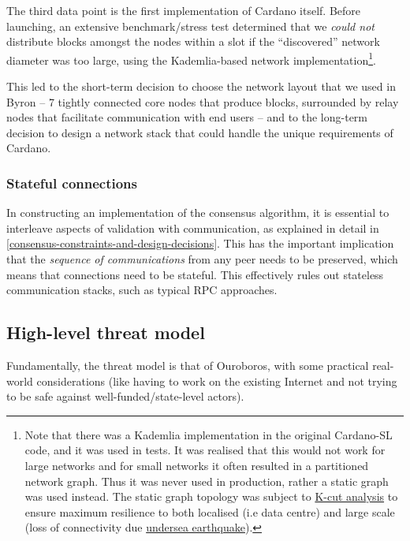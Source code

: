 \documentclass[11pt,a4paper]{article}
\begin{document}
The third data point is the first implementation of Cardano itself.
Before launching, an extensive benchmark/stress test determined that we
\emph{could not} distribute blocks amongst the nodes within a slot if
the ``discovered'' network diameter was too large, using the
Kademlia-based network implementation\footnote{Note that there was a
  Kademlia implementation in the original Cardano-SL code, and it was
  used in tests. It was realised that this would not work for large
  networks and for small networks it often resulted in a partitioned
  network graph. Thus it was never used in production, rather a static
  graph was used instead. The static graph topology was subject to
  \href{https://en.wikipedia.org/wiki/Minimum_k-cut}{{K-cut analysis}}
  to ensure maximum resilience to both localised (i.e data centre) and
  large scale (loss of connectivity due
  \href{https://www.telecomramblings.com/2010/06/subsea-quakes-and-transatlantic-cable-diversity/}{{undersea
  earthquake}}).}.

This led to the short-term decision to choose the network layout that we
used in Byron -- 7 tightly connected core nodes that produce blocks,
surrounded by relay nodes that facilitate communication with end users
-- and to the long-term decision to design a network stack that could
handle the unique requirements of Cardano.

\subsubsection{Stateful connections}
\label{stateful-connections}

In constructing an implementation of the consensus algorithm, it is
essential to interleave aspects of validation with communication, as
explained in detail in
\cref{consensus-constraints-and-design-decisions}. This has the important implication that the \emph{sequence of
communications} from any peer needs to be preserved, which means that
connections need to be stateful. This effectively rules out stateless
communication stacks, such as typical RPC approaches.

\subsection{High-level threat model}
\label{high-level-threat-model}

Fundamentally, the threat model is that of Ouroboros, with some
practical real-world considerations (like having to work on the existing
Internet and not trying to be safe against well-funded/state-level
actors).
\end{document}
